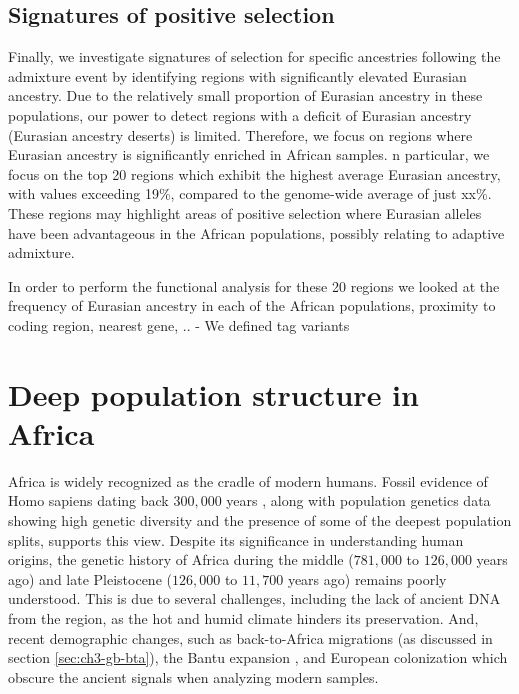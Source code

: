 

\subsection{Signatures of positive selection} 

Finally, we investigate signatures of selection for specific ancestries following the admixture event by identifying regions with significantly elevated Eurasian ancestry. Due to the relatively small proportion of Eurasian ancestry in these populations, our power to detect regions with a deficit of Eurasian ancestry (Eurasian ancestry deserts) is limited. Therefore, we focus on regions where Eurasian ancestry is significantly enriched in African samples. n particular, we focus on the top 20 regions which exhibit the highest average Eurasian ancestry, with values exceeding 19\%, compared to the genome-wide average of just xx\%. These regions may highlight areas of positive selection where Eurasian alleles have been advantageous in the African populations, possibly relating to adaptive admixture.

In order to perform the functional analysis for these 20 regions we looked at the frequency of Eurasian ancestry in each of the African populations, proximity to coding region, nearest gene, ..
- We defined tag variants




\section{Deep population structure in Africa}
\label{sec:ch3-gb-deep}

Africa is widely recognized as the cradle of modern humans. 
%
Fossil evidence of Homo sapiens dating back $300{,}000$ years \cite{day1969early,hublin2017new}, along with population genetics data showing high genetic diversity and the presence of some of the deepest population splits, supports this view.
%
Despite its significance in understanding human origins, the genetic history of Africa during the middle ($781{,}000$ to $126{,}000$ years ago) and late Pleistocene ($126{,}000$ to $11{,}700$ years ago) remains poorly understood. 
%
This is due to several challenges, including the lack of ancient DNA from the region, as the hot and humid climate hinders its preservation. And, recent demographic changes, such as back-to-Africa migrations (as discussed in section \ref{sec:ch3-gb-bta}), the Bantu expansion \cite{tishkoff2009genetic}, and European colonization which obscure the ancient signals when analyzing modern samples.

